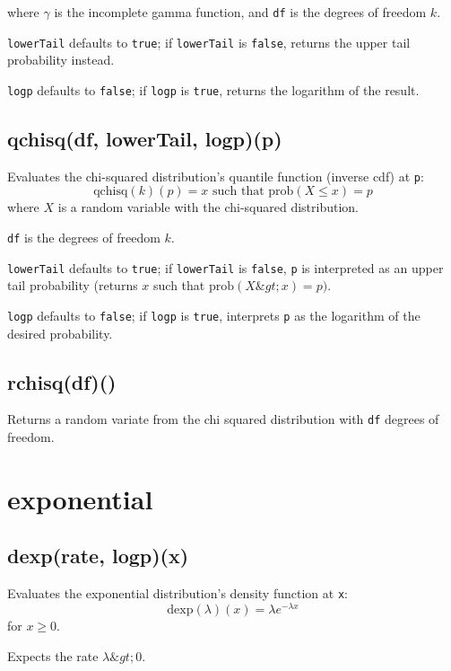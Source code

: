 \documentclass{article}
\begin{document}
where $\gamma$ is the incomplete gamma function, and
\texttt{df} is the degrees of freedom $k$.


\texttt{lowerTail} defaults to \texttt{true}; if \texttt{lowerTail} is \texttt{false}, returns
the upper tail probability instead.


\texttt{logp} defaults to \texttt{false}; if \texttt{logp} is \texttt{true}, returns the logarithm
of the result.


    \subsection*{qchisq(df, lowerTail, logp)(p)}
    Evaluates the chi-squared distribution's quantile function
(inverse cdf) at \texttt{p}:
$$\textrm{qchisq}(k)(p) = x \textrm{ such that } \textrm{prob}(X \leq x) = p$$
where $X$ is a random variable with the chi-squared distribution.


\texttt{df} is the degrees of freedom $k$.


\texttt{lowerTail} defaults to \texttt{true}; if \texttt{lowerTail} is \texttt{false}, \texttt{p} is
interpreted as an upper tail probability (returns
$x$ such that $\textrm{prob}(X \&gt; x) = p)$.


\texttt{logp} defaults to \texttt{false}; if \texttt{logp} is \texttt{true}, interprets \texttt{p} as
the logarithm of the desired probability.


    \subsection*{rchisq(df)()}
    Returns a random variate from the chi squared distribution with \texttt{df} degrees
of freedom.


  \section{exponential}
    \subsection*{dexp(rate, logp)(x)}
    Evaluates the exponential distribution's density function at \texttt{x}:
$$\textrm{dexp}(\lambda)(x) = \lambda e^{-\lambda x}$$
for $x \geq 0$.


Expects the rate $\lambda \&gt; 0$.
\end{document}
